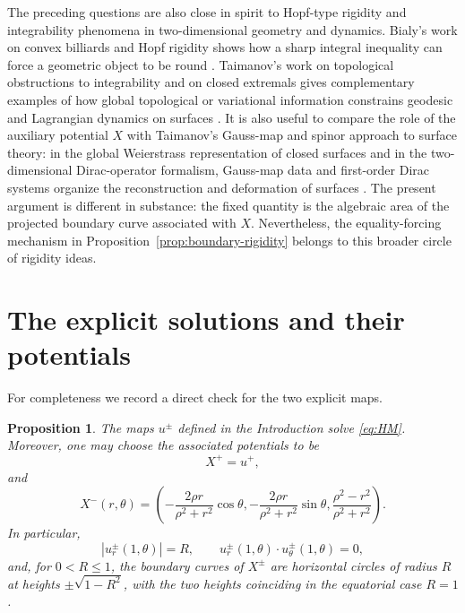 \documentclass[11pt]{amsart}
\numberwithin{equation}{section}
\newtheorem{proposition}[theorem]{Proposition}
\theoremstyle{remark}
\begin{document}
The preceding questions are also close in spirit to Hopf-type rigidity and integrability phenomena in two-dimensional geometry and dynamics.
Bialy's work on convex billiards and Hopf rigidity shows how a sharp integral inequality can force a geometric object to be round
\cite{Bialy1993,Bialy2013,Bialy2015}. Taimanov's work on topological obstructions to integrability and on closed extremals gives complementary
examples of how global topological or variational information constrains geodesic and Lagrangian dynamics on surfaces
\cite{Taimanov1988,Taimanov1992}. It is also useful to compare the role of the auxiliary potential $X$ with Taimanov's Gauss-map and spinor
approach to surface theory: in the global Weierstrass representation of closed surfaces and in the two-dimensional Dirac-operator formalism,
Gauss-map data and first-order Dirac systems organize the reconstruction and deformation of surfaces
\cite{Taimanov1998Weierstrass,Taimanov2006Dirac}. The present argument is different in substance: the fixed quantity is the algebraic area of
the projected boundary curve associated with $X$. Nevertheless, the equality-forcing mechanism in Proposition~\ref{prop:boundary-rigidity}
belongs to this broader circle of rigidity ideas.

\appendix

\section{The explicit solutions and their potentials}\label{app:explicit}

For completeness we record a direct check for the two explicit maps.

\begin{proposition}\label{prop:explicit-check}
The maps $u^\pm$ defined in the Introduction solve \eqref{eq:HM}. Moreover, one may choose the associated potentials to be
\[
X^+=u^+,
\]
and
\begin{equation}\label{eq:Xminus}
X^-(r,\theta)=
\left(
-\frac{2\rho r}{\rho^2+r^2}\cos\theta,
-\frac{2\rho r}{\rho^2+r^2}\sin\theta,
\frac{\rho^2-r^2}{\rho^2+r^2}
\right).
\end{equation}
In particular,
\[
|u_r^\pm(1,\theta)|=R,
\qquad
u_r^\pm(1,\theta)\cdot u_\theta^\pm(1,\theta)=0,
\]
and, for $0<R\le1$, the boundary curves of $X^\pm$ are horizontal circles of radius $R$ at heights $\pm\sqrt{1-R^2}$, with the two heights
coinciding in the equatorial case $R=1$.
\end{proposition}
\end{document}
